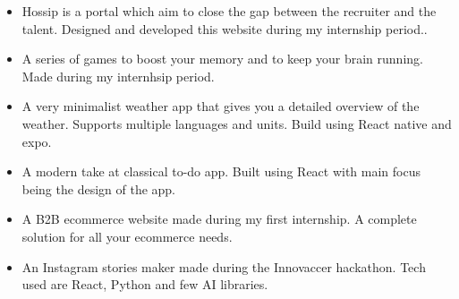 







\begin{itemize}
\item Hossip is a portal which aim to close the gap between the recruiter and the talent. Designed and developed this website during my internship period..
\end{itemize}
\smallskip
\smallskip
{}
\begin{itemize}
\item A series of games to boost your memory and to keep your brain running. Made during my internhsip period.
\end{itemize}
\smallskip
\smallskip
{}
\begin{itemize}
\item A very minimalist weather app that gives you a detailed overview of the weather. Supports multiple languages and units. Build using React native and expo.
\end{itemize}
\smallskip
\smallskip
{}
\begin{itemize}
\item A modern take at classical to-do app. Built using React with main focus being the design of the app.
\end{itemize}
\smallskip
\smallskip
{}
\begin{itemize}
\item A B2B ecommerce website made during my first internship. A complete solution for all your ecommerce needs.
\end{itemize}
\smallskip
\smallskip
{}
\begin{itemize}
\item An Instagram stories maker made during the Innovaccer hackathon. Tech used are React, Python and few AI libraries.
\end{itemize}
\cvproject{}